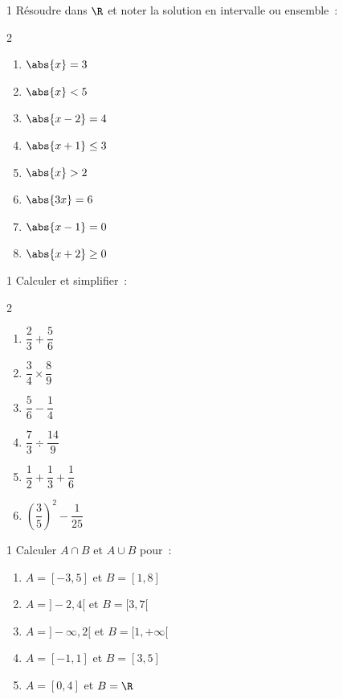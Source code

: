 \begin{exo}{1}
R\'esoudre dans $\R$ et noter la solution en intervalle ou ensemble~:
\begin{multicols}{2}
\begin{enumerate}
  \item $\abs{x} = 3$
  \item $\abs{x} < 5$
  \item $\abs{x-2} = 4$
  \item $\abs{x+1} \leq 3$
  \item $\abs{x} > 2$
  \item $\abs{3x} = 6$
  \item $\abs{x-1} = 0$
  \item $\abs{x+2} \geq 0$
\end{enumerate}
\end{multicols}
\end{exo}

\begin{exo}{1}
Calculer et simplifier~:
\begin{multicols}{2}
\begin{enumerate}
  \item $\dfrac{2}{3} + \dfrac{5}{6}$
  \item $\dfrac{3}{4} \times \dfrac{8}{9}$
  \item $\dfrac{5}{6} - \dfrac{1}{4}$
  \item $\dfrac{7}{3} \div \dfrac{14}{9}$
  \item $\dfrac{1}{2} + \dfrac{1}{3} + \dfrac{1}{6}$
  \item $\left(\dfrac{3}{5}\right)^2 - \dfrac{1}{25}$
\end{enumerate}
\end{multicols}
\end{exo}

\begin{exo}{1}
Calculer $A\cap B$ et $A\cup B$ pour~:
\begin{enumerate}
  \item $A = [-3,5]$ et $B = [1,8]$
  \item $A = ]-2,4[$ et $B = [3,7[$
  \item $A = ]-\infty,2[$ et $B = [1,+\infty[$
  \item $A = [-1,1]$ et $B = [3,5]$
  \item $A = [0,4]$ et $B = \R$
\end{enumerate}
\end{exo}

